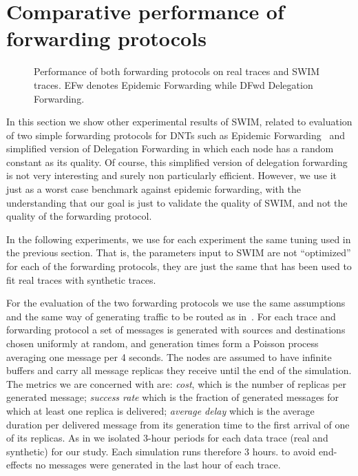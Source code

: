 \documentclass[conference]{IEEEtran}
\begin{document}
\section{Comparative performance of forwarding protocols}
\label{sec:forwarding}
\begin{figure*}
\label{fig:forwarding}
\centering
{}
\caption{Performance of both forwarding protocols on real traces and SWIM
traces. EFw denotes Epidemic Forwarding while DFwd Delegation Forwarding.}
\label{fig:performance}
\end{figure*}

In this section we show other experimental results of SWIM, related to
evaluation of two simple forwarding protocols for DNTs such as Epidemic
Forwarding~\cite{vahdat00epidemic} and simplified version of Delegation
Forwarding\cite{dfw08} in which each node has a random constant as its quality.
Of course, this simplified version of delegation forwarding is not very
interesting and surely non particularly efficient. However, we use it just as a
worst case benchmark against epidemic forwarding, with the understanding that
our goal is just to validate the quality of SWIM, and not the quality of the
forwarding protocol.

In the following experiments, we use for each experiment the same tuning used
in the previous section. That is, the parameters input to SWIM are not
``optimized'' for each of the forwarding protocols, they are just the same that
has been used to fit real traces with synthetic traces.

For the evaluation of the two forwarding protocols we use the same assumptions
and the same way of generating traffic to be routed as in~\cite{dfw08}.
For each trace and forwarding protocol a set of messages is generated with
sources and destinations chosen uniformly at random, and generation times form a
Poisson process averaging one message per 4 seconds.
The nodes are assumed to have infinite buffers and carry all message replicas
they receive until the end of the simulation. The metrics we are concerned with
are: \emph{cost}, which is the number of replicas per generated message;
\emph{success rate} which is the fraction of generated messages for which at
least one replica is delivered; \emph{average delay} which is the average
duration per delivered message from its generation time to the first arrival of
one of its replicas.
As in \cite{dfw08} we isolated 3-hour periods for each data trace (real and
synthetic) for our study. Each simulation runs therefore 3 hours. to avoid
end-effects no messages were generated in the last hour of each trace.
\end{document}
